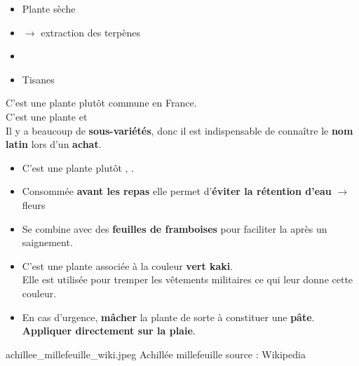 {%
    \begin{itemize}[label = \bccrayon]
        \item Plante sèche
        \item {}$\longrightarrow$ extraction des terpènes
        \item {}
        \item Tisanes
    \end{itemize}
}{%
    \begin{Remarque}

        C'est une plante plutôt commune en France.\\
        C'est une plante  et \\
        Il y a beaucoup de \textbf{sous-variétés}, donc il est indispensable de connaître le \textbf{nom latin} lors d'un \textbf{achat}.
        \begin{itemize}[label = \bcplume]
            \item C'est une plante plutôt , .
            \item Consommée \textbf{avant les repas} elle permet d'\textbf{éviter la rétention d'eau} $\longrightarrow$ fleurs
            \item Se combine avec des \textbf{feuilles de framboises} pour faciliter la  après un saignement.
            \item C'est une plante  associée à la couleur \textbf{vert kaki}.\\
                Elle est utilisée pour tremper les vêtements militaires ce qui leur donne cette couleur. 
            \item[\bcattention] En cas d'urgence, \textbf{mâcher} la plante de sorte à constituer une \textbf{pâte}.\\ 
                \textbf{Appliquer directement sur la plaie}.
        \end{itemize}
    \end{Remarque}
}
{%
    achillee_millefeuille_wiki.jpeg
}
{%
    Achillée millefeuille
}
{%
    source : Wikipedia 
}

